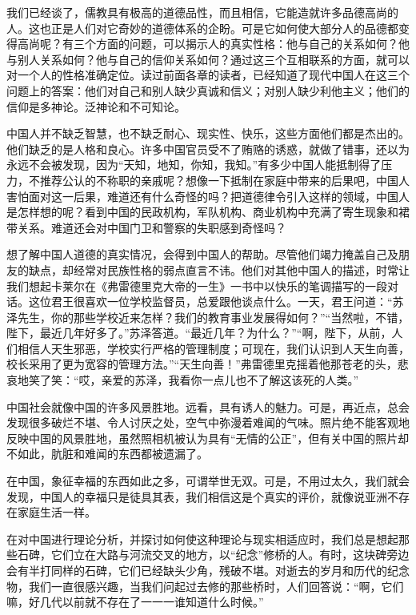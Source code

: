 \documentclass[12pt,oneside]{book}
\begin{document}
\begin{common-format}
我们已经谈了，儒教具有极高的道德品性，而且相信，它能造就许多品德高尚的人。这也正是人们对它奇妙的道德体系的企盼。可是它如何使大部分人的品德都变得高尚呢？有三个方面的问题，可以揭示人的真实性格：他与自己的关系如何？他与别人关系如何？他与自己的信仰关系如何？通过这三个互相联系的方面，就可以对一个人的性格准确定位。读过前面各章的读者，已经知道了现代中国人在这三个问题上的答案：他们对自己和别人缺少真诚和信义；对别人缺少利他主义；他们的信仰是多神论。泛神论和不可知论。 

中国人并不缺乏智慧，也不缺乏耐心、现实性、快乐，这些方面他们都是杰出的。他们缺乏的是人格和良心。许多中国官员受不了贿赂的诱惑，就做了错事，还以为永远不会被发现，因为“天知，地知，你知，我知。”有多少中国人能抵制得了压力，不推荐公认的不称职的亲戚呢？想像一下抵制在家庭中带来的后果吧，中国人害怕面对这一后果，难道还有什么奇怪的吗？把道德律令引入这样的领域，中国人是怎样想的呢？看到中国的民政机构，军队机构、商业机构中充满了寄生现象和裙带关系。难道还会对中国门卫和警察的失职感到奇怪吗？ 

想了解中国人道德的真实情况，会得到中国人的帮助。尽管他们竭力掩盖自己及朋友的缺点，却经常对民族性格的弱点直言不讳。他们对其他中国人的描述，时常让我们想起卡莱尔在《弗雷德里克大帝的一生》一书中以快乐的笔调描写的一段对话。这位君王很喜欢一位学校监督员，总爱跟他谈点什么。一天，君王问道：“苏泽先生，你的那些学校近来怎样？我们的教育事业发展得如何？”“当然啦，不错，陛下，最近几年好多了。”苏泽答道。“最近几年？为什么？”“啊，陛下，从前，人们相信人天生邪恶，学校实行严格的管理制度；可现在，我们认识到人天生向善，校长采用了更为宽容的管理方法。”“天生向善！”弗雷德里克摇着他那苍老的头，悲哀地笑了笑：“哎，亲爱的苏泽，我看你一点儿也不了解这该死的人类。” 

中国社会就像中国的许多风景胜地。远看，具有诱人的魅力。可是，再近点，总会发现很多破烂不堪、令人讨厌之处，空气中弥漫着难闻的气味。照片绝不能客观地反映中国的风景胜地，虽然照相机被认为具有“无情的公正”，但有关中国的照片却不如此，肮脏和难闻的东西都被遗漏了。 

在中国，象征幸福的东西如此之多，可谓举世无双。可是，不用过太久，我们就会发现，中国人的幸福只是徒具其表，我们相信这是个真实的评价，就像说亚洲不存在家庭生活一样。 

在对中国进行理论分析，并探讨如何使这种理论与现实相适应时，我们总是想起那些石碑，它们立在大路与河流交叉的地方，以“纪念”修桥的人。有时，这块碑旁边会有半打同样的石碑，它们已经缺头少角，残破不堪。对逝去的岁月和历代的纪念物，我们一直很感兴趣，当我们问起过去修的那些桥时，人们回答说：“啊，它们嘛，好几代以前就不存在了一一一谁知道什么时候。” 


\end{common-format}
\end{document}
